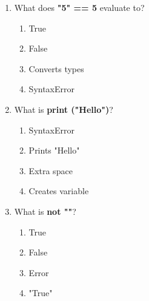 \documentclass{article}
\begin{document}
\begin{multicols*}{4}
\begin{enumerate}
        \item What does \textbf{"5" == 5} evaluate to?
        \begin{enumerate}[label=(\Alph*)]
            \item True
            \item False
            \item Converts types
            \item SyntaxError
        \end{enumerate}

        \item What is \textbf{print ("Hello")}? 
        \begin{enumerate}[label=(\Alph*)]
            \item SyntaxError 
            \item Prints "Hello" 
            \item Extra space 
            \item Creates variable
        \end{enumerate}

        \item What is \textbf{not ""}?
        \begin{enumerate}[label=(\Alph*)]
            \item True 
            \item False 
            \item Error 
            \item "True"
        \end{enumerate}

    \end{enumerate}

\end{multicols*}
\end{document}
